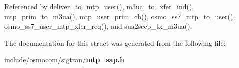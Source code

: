 Referenced by deliver\+\_\+to\+\_\+mtp\+\_\+user(), m3ua\+\_\+to\+\_\+xfer\+\_\+ind(), mtp\+\_\+prim\+\_\+to\+\_\+m3ua(), mtp\+\_\+user\+\_\+prim\+\_\+cb(), osmo\+\_\+ss7\+\_\+mtp\+\_\+to\+\_\+user(), osmo\+\_\+ss7\+\_\+user\+\_\+mtp\+\_\+xfer\+\_\+req(), and sua2sccp\+\_\+tx\+\_\+m3ua().



The documentation for this struct was generated from the following file\+:\begin{DoxyCompactItemize}
\item 
include/osmocom/sigtran/{\bf mtp\+\_\+sap.\+h}\end{DoxyCompactItemize}
